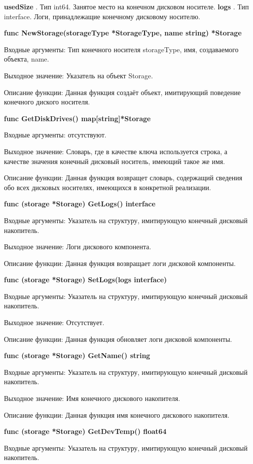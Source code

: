 \textbf{	usedSize }. Тип int64. Занятое место на конечном дисковом носителе.
\textbf{	logs }. Тип interface{}. Логи, принадлежащие конечному дисковому носителю.


\textbf{func NewStorage(storageType *StorageType, name string) *Storage}

Входные аргументы: Тип конечного носителя storageType, имя, создаваемого объекта, name. 

Выходное значение: Указатель на объект Storage. 

Описание функции: Данная функция создаёт объект, имитирующий поведение конечного диского носителя.

\textbf{func GetDiskDrives() map[string]*Storage}

Входные аргументы: отсутствуют.

Выходное значение: Словарь, где в качестве ключа используется строка, а качестве значения конечный дисковый носитель, имеющий такое же имя.

Описание функции: Данная функция возвращет словарь, содержащий сведения обо всех дисковых носителях, имеющихся в конкретной реализации. 

\textbf{func (storage *Storage) GetLogs() interface{}}

Входные аргументы: Указатель на структуру, имитирующую конечный дисковый накопитель.

Выходное значение: Логи дискового компонента. 

Описание функции: Данная функция возвращает логи дисковой компоненты. 

\textbf{func (storage *Storage) SetLogs(logs interface{})}

Входные аргументы: Указатель на структуру, имитирующую конечный дисковый накопитель.

Выходное значение:  Отсутствует.

Описание функции: Данная функция обновляет логи дисковой компоненты. 

\textbf{func (storage *Storage) GetName() string}

Входные аргументы: Указатель на структуру, имитирующую конечный дисковый накопитель.

Выходное значение: Имя конечного дискового накопителя.

Описание функции: Данная функция имя конечного дискового накопителя.

\textbf{func (storage *Storage) GetDevTemp() float64}

Входные аргументы: Указатель на структуру, имитирующую конечный дисковый накопитель.

